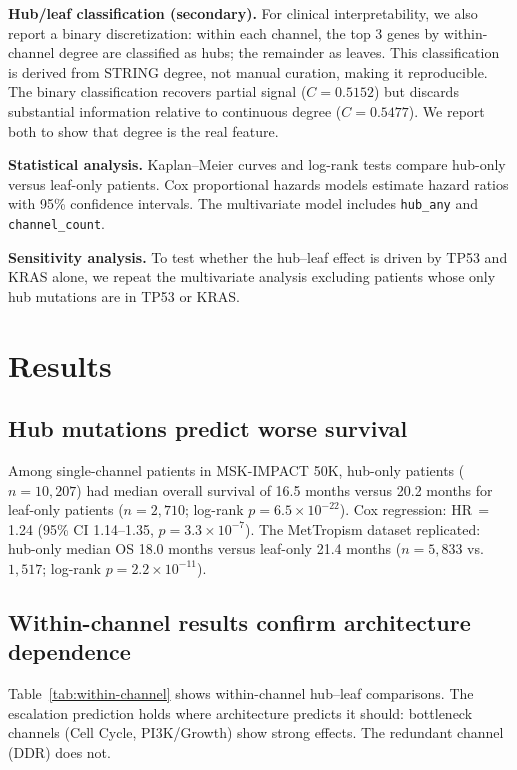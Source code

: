 \documentclass[11pt]{article}
\begin{document}
\textbf{Hub/leaf classification (secondary).}
For clinical interpretability, we also report a binary
discretization: within each channel, the top 3 genes by
within-channel degree are classified as hubs; the remainder as
leaves. This classification is derived from STRING degree, not
manual curation, making it reproducible. The binary classification
recovers partial signal ($C = 0.5152$) but discards substantial
information relative to continuous degree ($C = 0.5477$).
We report both to show that degree is the real feature.

\textbf{Statistical analysis.}
Kaplan--Meier curves and log-rank tests compare hub-only versus
leaf-only patients. Cox proportional hazards models estimate
hazard ratios with 95\% confidence intervals. The multivariate
model includes \texttt{hub\_any} and \texttt{channel\_count}.

\textbf{Sensitivity analysis.}
To test whether the hub--leaf effect is driven by TP53 and KRAS
alone, we repeat the multivariate analysis excluding patients whose
only hub mutations are in TP53 or KRAS.

\section{Results}
\label{sec:results}

\subsection{Hub mutations predict worse survival}
\label{sec:hub-leaf}

Among single-channel patients in MSK-IMPACT 50K, hub-only patients
($n = 10{,}207$) had median overall survival of 16.5 months versus
20.2 months for leaf-only patients ($n = 2{,}710$; log-rank
$p = 6.5 \times 10^{-22}$). Cox regression: HR\,$=$\,1.24 (95\% CI
1.14--1.35, $p = 3.3 \times 10^{-7}$). The MetTropism dataset
replicated: hub-only median OS 18.0 months versus leaf-only
21.4 months ($n = 5{,}833$ vs.\ $1{,}517$; log-rank
$p = 2.2 \times 10^{-11}$).

\subsection{Within-channel results confirm architecture dependence}

Table~\ref{tab:within-channel} shows within-channel hub--leaf
comparisons. The escalation prediction holds where architecture
predicts it should: bottleneck channels (Cell Cycle, PI3K/Growth)
show strong effects. The redundant channel (DDR) does not.
\end{document}
